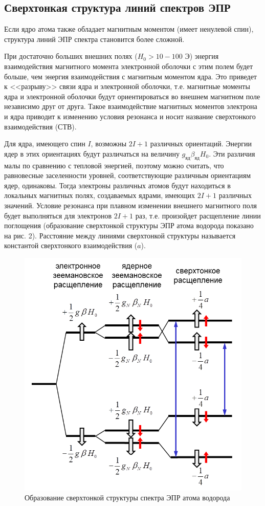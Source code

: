 \documentclass[a4paper,14pt]{article}
\begin{document}
\subsection{Сверхтонкая структура линий спектров ЭПР}
Если ядро атома также обладает магнитным моментом (имеет ненулевой спин), структура линий ЭПР спектра становится более сложной.
\par
При достаточно больших внешних полях ($ H_0 > 10-100 $ Э) энергия взаимодействия магнитного момента электронной оболочки с этим полем будет больше, чем энергия взаимодействия с магнитным моментом ядра. Это приведет к <<разрыву>> связи ядра и электронной оболочки, т.е. магнитные моменты ядра и электронной оболочки будут ориентироваться во внешнем магнитном поле независимо друг от друга. Такое взаимодействие магнитных моментов электрона и ядра приводит к изменению условия резонанса и носит название сверхтонкого взаимодействия (СТВ).
\par 
 Для ядра, имеющего спин $ I $, возможны $ 2I + 1 $ различных ориентаций. Энергии ядер в этих ориентациях будут различаться на величину $ g_{\text{яд}}\beta_{\text{яд}}H_0 $. Эти различия малы по сравнению с тепловой энергией, поэтому можно считать, что равновесные заселенности уровней, соответствующие различным ориентациям ядер, одинаковы. Тогда электроны различных атомов будут находиться в локальных магнитных полях, создаваемых ядрами, имеющих $ 2I + 1 $ различных значений. Условие резонанса при плавном изменении внешнего магнитного поля будет выполняться для электронов $ 2I + 1 $ раз, т.е. произойдет расщепление линии поглощения (образование сверхтонкой структуры ЭПР атома водорода показано на рис. 2). Расстояние между линиями сверхтонкой структуры называется константой сверхтонкого взаимодействия ($ a $).
\begin{figure}[h]
	\centering
	\includegraphics{рис2}
	\caption{Образование сверхтонкой структуры спектра ЭПР атома водорода}
	\label{fig:2}
\end{figure}
\end{document}
